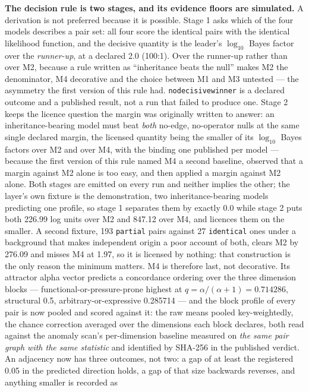 \documentclass[11pt]{article}
\DeclareRobustCommand{\_}{\textunderscore\allowbreak}
\begin{document}
\textbf{The decision rule is two stages, and its evidence floors are simulated.} A derivation is not preferred
because it is possible. Stage 1 asks which of the four models describes a pair set: all four score the
identical pairs with the identical likelihood function, and the decisive quantity is the leader's
\(\log_{10}\) Bayes factor over the \emph{runner-up}, at a declared 2.0 (100:1). Over the runner-up rather than
over M2, because a rule written as ``inheritance beats the null'' makes M2 the denominator, M4 decorative and
the choice between M1 and M3 untested --- the asymmetry the first version of this rule had.
\texttt{no\_decisive\_winner} is a declared outcome and a published result, not a run that failed to produce
one. Stage 2 keeps the licence question the margin was originally written to answer: an inheritance-bearing
model must beat \emph{both} no-edge, no-operator nulls at the same single declared margin, the licensed quantity
being the smaller of its \(\log_{10}\) Bayes factors over M2 and over M4, with the binding one published per
model --- because the first version of this rule named M4 a second baseline, observed that a margin against M2
alone is too easy, and then applied a margin against M2 alone. Both stages are emitted on every run and neither
implies the other; the layer's own fixture is the demonstration, two inheritance-bearing models predicting one
profile, so stage 1 separates them by exactly 0.0 while stage 2 puts both 226.99 log units over M2 and 847.12
over M4, and licences them on the smaller. A second fixture, 193 \texttt{partial} pairs against 27
\texttt{identical} ones under a background that makes independent origin a poor account of both, clears M2 by
276.09 and misses M4 at 1.97, so it is licensed by nothing: that construction is the only reason the minimum
matters. M4 is therefore last, not decorative. Its attractor alpha vector predicts a concordance ordering over
the three dimension blocks --- functional-or-pressure-prone highest at \(q = \alpha/(\alpha + 1) = 0.714286\),
structural 0.5, arbitrary-or-expressive 0.285714 --- and the block profile of every pair is now pooled
and scored against it: the raw means pooled key-weightedly, the chance correction averaged over the
dimensions each block declares, both read against the anomaly scan's per-dimension baseline measured on
\emph{the same pair graph with the same statistic} and identified by SHA-256 in the published verdict. An
adjacency now has three outcomes, not two: a gap of at least the registered 0.05 in the predicted direction
holds, a gap of that size backwards reverses, and anything smaller is recorded as
\end{document}

